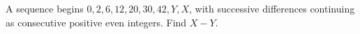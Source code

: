 A sequence begins $0,2,6,12,20,30,42,Y,X$, with successive differences continuing as consecutive positive even integers. Find $X-Y$.
